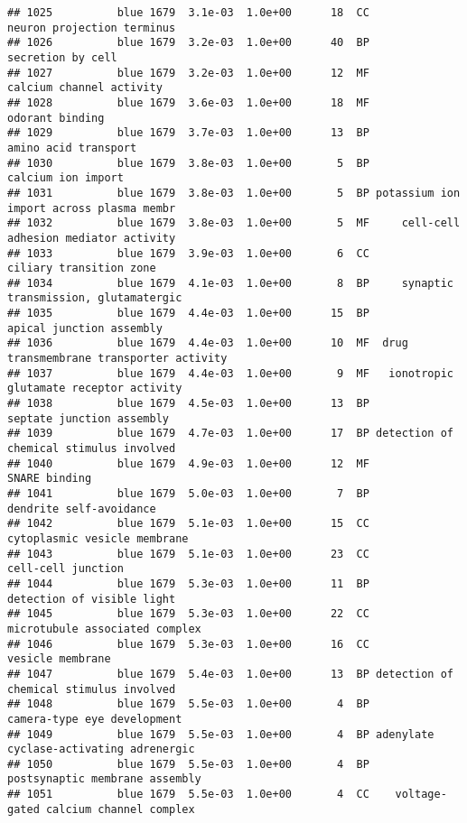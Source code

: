 \documentclass[]{article}
\begin{document}
\begin{verbatim}
## 1025          blue 1679  3.1e-03  1.0e+00      18  CC               neuron projection terminus
## 1026          blue 1679  3.2e-03  1.0e+00      40  BP                        secretion by cell
## 1027          blue 1679  3.2e-03  1.0e+00      12  MF                 calcium channel activity
## 1028          blue 1679  3.6e-03  1.0e+00      18  MF                          odorant binding
## 1029          blue 1679  3.7e-03  1.0e+00      13  BP                     amino acid transport
## 1030          blue 1679  3.8e-03  1.0e+00       5  BP                       calcium ion import
## 1031          blue 1679  3.8e-03  1.0e+00       5  BP potassium ion import across plasma membr
## 1032          blue 1679  3.8e-03  1.0e+00       5  MF     cell-cell adhesion mediator activity
## 1033          blue 1679  3.9e-03  1.0e+00       6  CC                  ciliary transition zone
## 1034          blue 1679  4.1e-03  1.0e+00       8  BP     synaptic transmission, glutamatergic
## 1035          blue 1679  4.4e-03  1.0e+00      15  BP                 apical junction assembly
## 1036          blue 1679  4.4e-03  1.0e+00      10  MF  drug transmembrane transporter activity
## 1037          blue 1679  4.4e-03  1.0e+00       9  MF   ionotropic glutamate receptor activity
## 1038          blue 1679  4.5e-03  1.0e+00      13  BP                septate junction assembly
## 1039          blue 1679  4.7e-03  1.0e+00      17  BP detection of chemical stimulus involved 
## 1040          blue 1679  4.9e-03  1.0e+00      12  MF                            SNARE binding
## 1041          blue 1679  5.0e-03  1.0e+00       7  BP                  dendrite self-avoidance
## 1042          blue 1679  5.1e-03  1.0e+00      15  CC             cytoplasmic vesicle membrane
## 1043          blue 1679  5.1e-03  1.0e+00      23  CC                       cell-cell junction
## 1044          blue 1679  5.3e-03  1.0e+00      11  BP               detection of visible light
## 1045          blue 1679  5.3e-03  1.0e+00      22  CC           microtubule associated complex
## 1046          blue 1679  5.3e-03  1.0e+00      16  CC                         vesicle membrane
## 1047          blue 1679  5.4e-03  1.0e+00      13  BP detection of chemical stimulus involved 
## 1048          blue 1679  5.5e-03  1.0e+00       4  BP              camera-type eye development
## 1049          blue 1679  5.5e-03  1.0e+00       4  BP adenylate cyclase-activating adrenergic 
## 1050          blue 1679  5.5e-03  1.0e+00       4  BP           postsynaptic membrane assembly
## 1051          blue 1679  5.5e-03  1.0e+00       4  CC    voltage-gated calcium channel complex

\end{verbatim}
\end{document}
